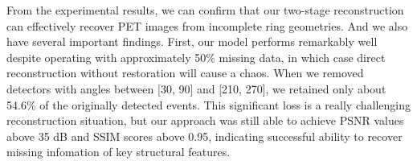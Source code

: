 \documentclass[12pt]{iopart}
\begin{document}



From the experimental results, we can  confirm that our two-stage reconstruction can effectively recover  PET images from incomplete ring geometries. And we also have several important findings. 
First, our model performs remarkably well despite operating with approximately 50\% missing data, in which case direct reconstruction without restoration will cause a chaos. When we removed detectors with angles between [30, 90] and [210, 270], we retained only about 54.6\% of the originally detected events. This significant loss is a really challenging reconstruction situation, but our approach was still able to achieve PSNR values above 35 dB and SSIM scores above 0.95, indicating successful ability to recover missing infomation of key structural features.
\end{document}
